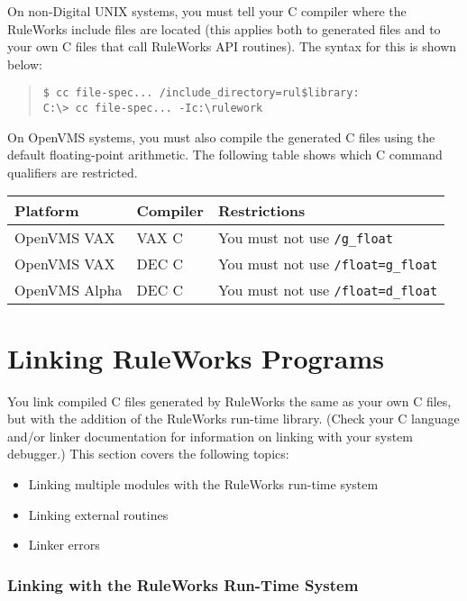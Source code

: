 On non-Digital UNIX systems, you must tell your C compiler where the
RuleWorks include files are located (this applies both to generated
files and to your own C files that call RuleWorks API routines). The
syntax for this is shown below:

\begin{quote}
\begin{verbatim}
$ cc file-spec... /include_directory=rul$library:
C:\> cc file-spec... -Ic:\rulework
\end{verbatim}
\end{quote}

On OpenVMS systems, you must also compile the generated C files using
the default floating-point arithmetic. The following table shows which
C command qualifiers are restricted.

\begin{center}
\begin{tabular}{lll}
  \toprule
  Platform & Compiler & Restrictions \\
  \midrule
  OpenVMS VAX & VAX C & You must not use \verb|/g_float| \\
  OpenVMS VAX & DEC C & You must not use \verb|/float=g_float| \\
   OpenVMS Alpha & DEC C & You must not use \verb|/float=d_float| \\
  \bottomrule
\end{tabular}
\end{center}

\section{Linking RuleWorks Programs}

You link compiled C files generated by RuleWorks the same as your own
C files, but with the addition of the RuleWorks run-time
library. (Check your C language and/or linker documentation for
information on linking with your system debugger.) This section covers
the following topics:

\begin{itemize}
\item Linking multiple modules with the RuleWorks run-time system
\item Linking external routines
\item Linker errors
\end{itemize}

\subsubsection{Linking with the RuleWorks Run-Time System}

